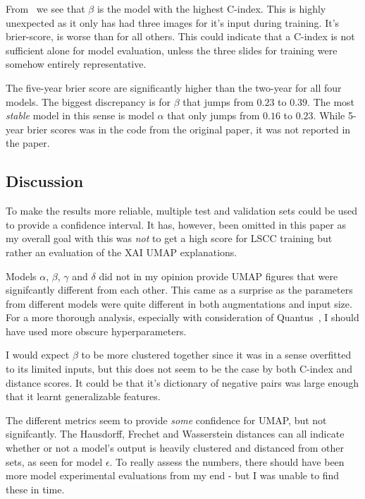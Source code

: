 \documentclass[10pt,twocolumn,letterpaper]{article}
\begin{document}
From~ we see that $\beta$ is the model with the highest C-index. This is highly unexpected as it only has had three images for it's input during training. It's brier-score, is worse than for all others. This could indicate that a C-index is not sufficient alone for model evaluation, unless the three slides for training were somehow entirely representative.

The five-year brier score are significantly higher than the two-year for all four models. The biggest discrepancy is for $\beta$ that jumps from $0.23$ to $0.39$. The most \textit{stable} model in this sense is model $\alpha$ that only jumps from $0.16$ to $0.23$. While 5-year brier scores was in the code from the original paper, it was not reported in the paper.

\subsection{Discussion}\label{sec:discussion}
To make the results more reliable, multiple test and validation sets could be used to provide a confidence interval. It has, however, been omitted in this paper as my overall goal with this was \textit{not} to get a high score for \gls{LSCC} training but rather an evaluation of the \gls{XAI} \gls{UMAP} explanations.

Models $\alpha$, $\beta$, $\gamma$ and $\delta$ did not in my opinion provide \gls{UMAP} figures that were signifcantly different from each other. This came as a surprise as the parameters from different models were quite different in both augmentations and input size. For a more thorough analysis, especially with consideration of Quantus~\cite{hedstrom2023quantus}, I should have used more obscure hyperparameters. 

I would expect $\beta$ to be more clustered together since it was in a sense overfitted to its limited inputs, but this does not seem to be the case by both C-index and distance scores. It could be that it's dictionary of negative pairs was large enough that it learnt generalizable features. 

The different metrics seem to provide \textit{some} confidence for \gls{UMAP}, but not signifcantly. The Hausdorff, Frechet and Wasserstein distances can all indicate whether or not a model's output is heavily clustered and distanced from other sets, as seen for model $\epsilon$. To really assess the numbers, there should have been more model experimental evaluations from my end - but I was unable to find these in time.
\end{document}
